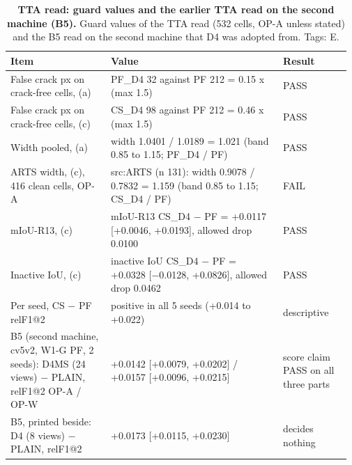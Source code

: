 \begin{table}[htbp]
\centering
\footnotesize
\setlength{\tabcolsep}{3pt}
\caption[TTA read: guard values and the earlier TTA read on the second machine (B5)]{\textbf{TTA read: guard values and the earlier TTA read on the second machine (B5).} Guard values of the TTA read (532 cells, OP-A unless stated) and the B5 read on the second machine that D4 was adopted from. Tags: E.}
\label{tab:T7b}
\begin{tabular}{@{}>{\raggedright\arraybackslash\hspace{0pt}}p{0.290\linewidth}>{\raggedright\arraybackslash\hspace{0pt}}p{0.483\linewidth}>{\raggedright\arraybackslash\hspace{0pt}}p{0.193\linewidth}@{}}
\toprule
\textbf{Item} & \textbf{Value} & \textbf{Result} \\
\midrule
False crack px on crack-free cells, (a) & PF\_\allowbreak{}D4 32 against PF 212 = 0.15 x (max 1.5) & PASS \\
False crack px on crack-free cells, (c) & CS\_\allowbreak{}D4 98 against PF 212 = 0.46 x (max 1.5) & PASS \\
Width pooled, (a) & width 1.0401 / 1.0189 = 1.021 (band 0.85 to 1.15; PF\_\allowbreak{}D4 / PF) & PASS \\
ARTS width, (c), 416 clean cells, OP-A & src:ARTS (n 131): width 0.9078 / 0.7832 = 1.159 (band 0.85 to 1.15; CS\_\allowbreak{}D4 / PF) & FAIL \\
mIoU-R13, (c) & mIoU-R13 CS\_\allowbreak{}D4 $-$ PF = +0.0117 [+0.0046, +0.0193], allowed drop 0.0100 & PASS \\
Inactive IoU, (c) & inactive IoU CS\_\allowbreak{}D4 $-$ PF = +0.0328 [$-$0.0128, +0.0826], allowed drop 0.0462 & PASS \\
Per seed, CS $-$ PF relF1@2 & positive in all 5 seeds (+0.014 to +0.022) & descriptive \\
B5 (second machine, cv5v2, W1-G PF, 2 seeds): D4MS (24 views) $-$ PLAIN, relF1@2 OP-A / OP-W & +0.0142 [+0.0079, +0.0202] / +0.0157 [+0.0096, +0.0215] & score claim PASS on all three parts \\
B5, printed beside: D4 (8 views) $-$ PLAIN, relF1@2 & +0.0173 [+0.0115, +0.0230] & decides nothing \\
\bottomrule
\end{tabular}
\end{table}

